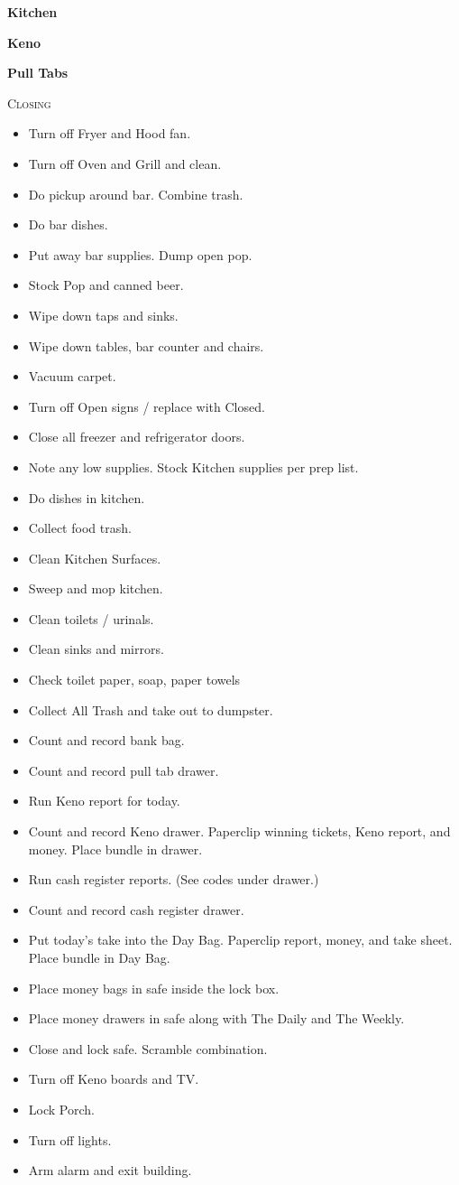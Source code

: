 \documentclass{tufte-handout}
\begin{document}
\textbf{Kitchen}

\textbf{Keno}

\textbf{Pull Tabs}

\begin{center}
\textsc{Closing}
\end{center}
\begin{itemize}
\item Turn off Fryer and Hood fan.
\item Turn off Oven and Grill and clean.
\item Do pickup around bar. Combine trash.
\item Do bar dishes.
\item Put away bar supplies. Dump open pop.
\item Stock Pop and canned beer.
\item Wipe down taps and sinks.
\item Wipe down tables, bar counter and chairs.
\item Vacuum carpet.
\item Turn off Open signs / replace with Closed.
\item Close all freezer and refrigerator doors.
\item Note any low supplies. Stock Kitchen supplies per prep list.
\item Do dishes in kitchen.
\item Collect food trash.
\item Clean Kitchen Surfaces.
\item Sweep and mop kitchen.
\item Clean toilets / urinals.
\item Clean sinks and mirrors.
\item Check toilet paper, soap, paper towels
\item Collect All Trash and take out to dumpster.
\item Count and record bank bag.
\item Count and record pull tab drawer.
\item Run Keno report for today.
\item Count and record Keno drawer. Paperclip winning tickets, Keno report, and money. Place bundle in drawer.
\item Run cash register reports. (See codes under drawer.)
\item Count and record cash register drawer.
\item Put today's take into the Day Bag. Paperclip report, money, and take sheet. Place bundle in Day Bag.
\item Place money bags in safe inside the lock box.
\item Place money drawers in safe along with The Daily and The Weekly.
\item Close and lock safe. Scramble combination.
\item Turn off Keno boards and TV.
\item Lock Porch.
\item Turn off lights.
\item Arm alarm and exit building.
\end{itemize}
\end{document}
